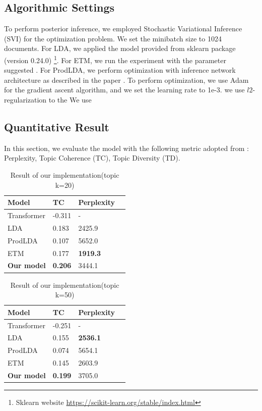\subsection{Algorithmic Settings}
To perform posterior inference, we employed Stochastic Variational Inference (SVI) \cite{hoffman_stochastic_2013} for the optimization problem. We set the minibatch size to 1024 documents.
For LDA, we applied the model provided from sklearn package (version 0.24.0) \footnote{Sklearn website \url{https://scikit-learn.org/stable/index.html}}. For ETM, we run the experiment with the parameter suggested \cite{dieng_topic_2019}. For ProdLDA, we perform optimization with inference network architecture as described in the paper \cite{srivastava_autoencoding_2017}. 
To perform optimization, we use Adam for the gradient ascent algorithm, and we set the learning rate to 1e-3.
we use $ l2 $-regularization to the 
We use 

% 
\subsection{Quantitative Result}
In this section, we evaluate the model with the following metric adopted from \cite{dieng_dynamic_2019}: Perplexity, Topic Coherence (TC), Topic Diversity (TD). %
\begin{table}[h]
\centering
\begin{tabular}{llll}
\hline
Model      & TC     & Perplexity  \\ \hline
Transformer & -0.311 & - \\
LDA & 0.183 & 2425.9 \\
ProdLDA		&  0.107 & 5652.0\\
ETM	     	&  0.177 & \textbf{1919.3}\\
\textbf{Our model}  & \textbf{0.206} & 3444.1 \\ \hline
\end{tabular}
\label{tbl:t1}
\caption{Result of our implementation(topic k=20)}
\end{table}
\begin{table}[h]
\centering
\begin{tabular}{llll}
\hline
Model      & TC     & Perplexity  \\ \hline
Transformer & -0.251 & - \\
LDA & 0.155 & \textbf{2536.1} \\
ProdLDA		&  0.074 & 5654.1\\
ETM	     	&  0.145 & 2603.9\\
\textbf{Our model}  & \textbf{0.199} & 3705.0 \\ \hline
\end{tabular}
\label{tbl:t2}
\caption{Result of our implementation(topic k=50)}
\end{table}
